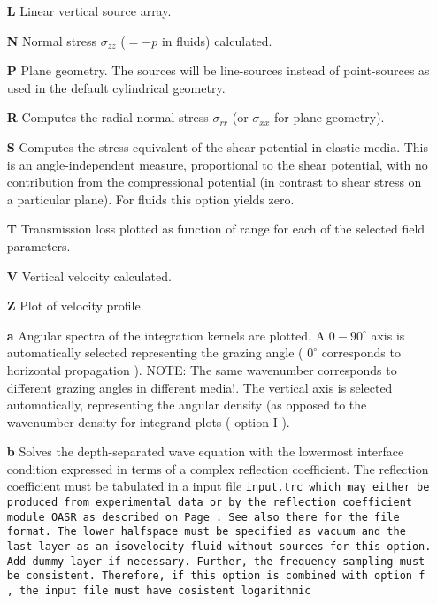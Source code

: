 \begin{itemize}
	     \item[{\bf L}] Linear vertical source array.
	     \item[{\bf N}] Normal stress $\sigma_{zz}$ ($=-p$ in fluids) calculated.
	     \item[{\bf P}] Plane geometry. The sources will be line-sources
		instead of point-sources as used in the default
		cylindrical geometry.
    \item[{\bf R}] Computes the radial normal stress $\sigma_{rr}$ (or
		$\sigma_{xx}$ 	for plane geometry). 
    \item[{\bf S}] Computes the stress equivalent of the shear potential in
         elastic media. This is an angle-independent measure, proportional to 
         the shear potential, with no contribution from the compressional 
         potential (in contrast to shear stress on a particular plane). 
        	For fluids this option yields zero.
	     \item[{\bf T}] Transmission loss plotted as function of
		range for each of the selected field
		parameters.
	     \item[{\bf V}] Vertical velocity calculated.
	     \item[{\bf Z}] Plot of velocity profile.
    \item[{\bf a}]     Angular spectra of the integration kernels are plotted. 
          A  $0 - 90^{\circ}$ axis is automatically selected  representing 
          the  grazing  angle  (  $0^{\circ}$  corresponds  to  horizontal 
          propagation ). NOTE: The same wavenumber corresponds to 
          different  grazing  angles  in  different  media!.  The 
          vertical  axis is selected automatically,  representing 
          the  angular  density  (as opposed  to  the  wavenumber 
          density for integrand plots ( option I ).
    \item[{\bf b}] Solves the depth-separated wave equation with the
lowermost  interface condition expressed in terms of a complex
reflection coefficient. The reflection coefficient must be tabulated in a input file \tt input.trc \rm
which may either be produced from experimental data or by the
reflection coefficient module OASR as described on
Page\,\pageref{trc-form}. See also there for the file format.
The lower halfspace must be specified as vacuum and the last layer as
an isovelocity fluid without sources for this option. Add dummy layer
if necessary. Further, the
frequency sampling must be consistent. Therefore, if this option is
combined with option \tt f \rm, the input file must have cosistent logarithmic

\end{itemize}
